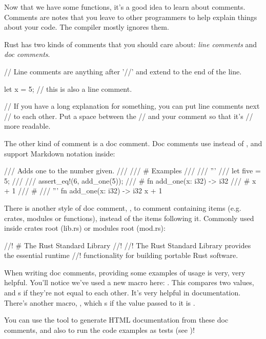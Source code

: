Now that we have some functions, it's a good idea to learn about comments. Comments are notes that you leave to other programmers to 
help explain things about your code. The compiler mostly ignores them.

\blank

Rust has two kinds of comments that you should care about: \emph{line comments} and \emph{doc comments}.

\begin{rustc}
// Line comments are anything after '//' and extend to the end of the line.

let x = 5; // this is also a line comment.

// If you have a long explanation for something, you can put line comments next
// to each other. Put a space between the // and your comment so that it's
// more readable.
\end{rustc}

The other kind of comment is a doc comment. Doc comments use \code{///} instead of \code{//}, and support Markdown notation inside:

\begin{rustc}
/// Adds one to the number given.
///
/// # Examples
///
/// '''
/// let five = 5;
///
/// assert_eq!(6, add_one(5));
/// # fn add_one(x: i32) -> i32 {
/// #     x + 1
/// # }
/// '''
fn add_one(x: i32) -> i32 {
    x + 1
}
\end{rustc}

There is another style of doc comment, \code{//!}, to comment containing items (e.g. crates, modules or functions), instead of the 
items following it. Commonly used inside crates root (lib.rs) or modules root (mod.rs):

\begin{rustc}
//! # The Rust Standard Library
//!
//! The Rust Standard Library provides the essential runtime
//! functionality for building portable Rust software.
\end{rustc}

When writing doc comments, providing some examples of usage is very, very helpful. You'll notice we've used a new macro here: 
. This compares two values, and \panic s if they're not equal to each other. It's very helpful in documentation.
There's another macro, , which \panic s if the value passed to it is .

\blank

You can use the  tool to generate HTML documentation from these doc comments, and also to run the code examples as tests
(see )!
